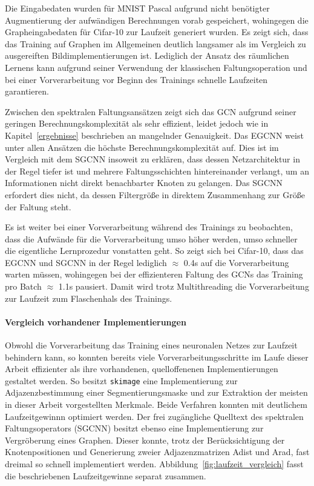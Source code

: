 Die Eingabedaten wurden für \gls{MNIST} \bzw{} \gls{Pascal} aufgrund nicht benötigter Augmentierung \bzw{} der aufwändigen Berechnungen vorab gespeichert, wohingegen die Grapheingabedaten für \gls{Cifar}-10 zur Laufzeit generiert wurden.
Es zeigt sich, dass das Training auf Graphen im Allgemeinen deutlich langsamer als im Vergleich zu ausgereiften Bildimplementierungen ist.
Lediglich der Ansatz des räumlichen Lernens kann aufgrund seiner Verwendung der klassischen Faltungsoperation und bei einer Vorverarbeitung vor Beginn des Trainings schnelle Laufzeiten garantieren.

Zwischen den spektralen Faltungsansätzen zeigt sich das \acs{GCN} aufgrund seiner geringen Berechnungskomplexität als sehr effizient, leidet jedoch wie in Kapitel~\ref{ergebnisse} beschrieben an mangelnder Genauigkeit.
Das \acs{EGCNN} weist unter allen Ansätzen die höchste Berechnungskomplexität auf.
Dies ist im Vergleich mit dem \acs{SGCNN} insoweit zu erklären, dass dessen Netzarchitektur in der Regel tiefer ist und mehrere Faltungsschichten hintereinander verlangt, um an Informationen nicht direkt benachbarter Knoten zu gelangen.
Das \acs{SGCNN} erfordert dies nicht, da dessen Filtergröße in direktem Zusammenhang zur Größe der Faltung steht.

Es ist weiter bei einer Vorverarbeitung während des Trainings zu beobachten, dass die Aufwände für die Vorverarbeitung umso höher werden, umso schneller die eigentliche Lernprozedur vonstatten geht.
So zeigt sich \bspw{} bei \gls{Cifar}-10, dass das \acs{EGCNN} und \acs{SGCNN} in der Regel lediglich $\approx$ 0.4s auf die Vorverarbeitung warten müssen, wohingegen bei der effizienteren Faltung des \acs{GCN}s das Training pro Batch $\approx$ 1.1s pausiert.
Damit wird trotz Multithreading die Vorverarbeitung zur Laufzeit zum Flaschenhals des Trainings.

\paragraph{Vergleich \bzgl{} vorhandener Implementierungen}
\label{vergleich_laufzeit}

Obwohl die Vorverarbeitung das Training eines neuronalen Netzes zur Laufzeit behindern kann, so konnten bereits viele Vorverarbeitungsschritte im Laufe dieser Arbeit effizienter als ihre vorhandenen, quelloffenenen Implementierungen gestaltet werden.
So besitzt \bspw{} \texttt{skimage} eine Implementierung zur Adjazenzbestimmung einer Segmentierungsmaske und zur Extraktion der meisten in dieser Arbeit vorgestellten Merkmale.
Beide Verfahren konnten mit deutlichem Laufzeitgewinnn optimiert werden.
Der frei zugängliche Quelltext des spektralen Faltungsoperators (\acs{SGCNN}) besitzt ebenso eine Implementierung zur Vergröberung eines Graphen.
Dieser konnte, trotz der Berücksichtigung der Knotenpositionen und Generierung zweier Adjazenzmatrizen \gls{Adist} und \gls{Arad}, fast dreimal so schnell implementiert werden.
Abbildung~\ref{fig:laufzeit_vergleich} fasst die beschriebenen Laufzeitgewinne separat zusammen.

